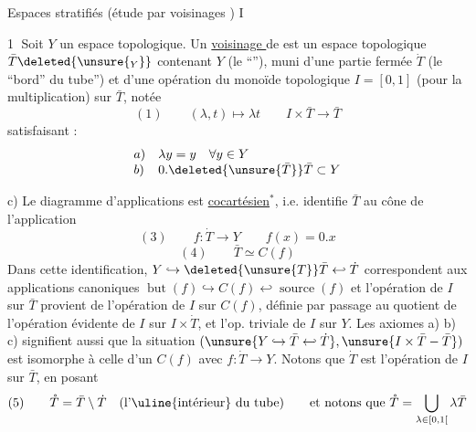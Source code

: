 Espaces stratifiés (étude par voisinages 
)
\textcircled{I}

\textcircled{1} Soit $Y$ un espace topologique. Un \uline{voisinage } 
 de 
 est un espace topologique
$\bar T\deleted{\unsure{_Y}}$ contenant $Y$
(le ``\uline{}''), muni d'une partie fermée $\dot T$
(le ``bord'' du tube'') et d'une opération du monoïde topologique
$I=[0,1]$ (pour la multiplication) sur $\bar T$, notée
\[
(1)\qquad (\lambda,t)\longmapsto\lambda t
\qquad I\times\bar T\longrightarrow\bar T
\]
satisfaisant :
\[
\begin{array}{ll}
a)&\lambda y=y\quad\forall y\in Y\\
b)&0.\deleted{\unsure{\bar T}}\bar T\subset Y
\end{array}
\]

c) Le  diagramme d'applications
est \uline{cocartésien}$^{*}$, i.e. identifie $\bar T$ au cône de l'application
\[
(3)\qquad f:\dot T\longrightarrow Y\qquad f(x)=0.x
\]
\margin{$^{*}$ Cela signifie que
$]0,1]\times\dot T\xrightarrow[\sim]{\mathrm{bij.}}\bar T\setminus Y$
et qu'une partie de $\bar T$ est ouverte ssi
\deleted{\unsure{son intersection}} \inserted{\unsure{ses images}}
\unsure{dans $Y$ et ses images dans $I\times\dot T$}.}
\[
(4)\qquad \bar T\simeq C(f)
\]
Dans cette identification, $Y\hookrightarrow\deleted{\unsure{T}}\bar T
\hookleftarrow\dot T$ correspondent
aux applications canoniques 
$\operatorname{but}(f)\hookrightarrow C(f)\hookleftarrow
\operatorname{source}(f)$
et l'opération de $I$ sur $\bar T$ provient de l'opération de
$I$ sur $C(f)$, définie par passage au quotient de
l'opération évidente de $I$ sur $I\times\dot T$, et l'op. triviale
de $I$ sur $Y$. Les axiomes a) b) c) signifient
aussi que la situation $(\unsure{Y\hookrightarrow\bar T\hookleftarrow\dot T},
\unsure{I\times\bar T-\bar T})$
est isomorphe à celle d'un $C(f)$ avec $f:\dot T\longrightarrow Y$.
Notons que $\dot T$ est  l'opération
de $I$ sur $\bar T$,  en posant
\[
(5)\qquad \mathring T=\bar T\setminus\dot T
\quad\text{(l'\uline{intérieur} du tube)}
\qquad\text{et notons que }\mathring T=\bigcup_{\lambda\in[0,1[}\lambda\bar T
\]
